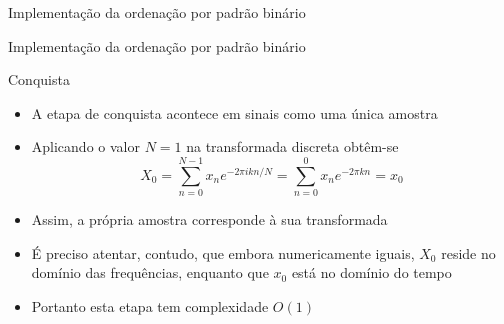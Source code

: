 

\begin{frame}[fragile]{Implementação da ordenação por padrão binário}
\end{frame}

\begin{frame}[fragile]{Implementação da ordenação por padrão binário}
\end{frame}

\begin{frame}[fragile]{Conquista}

    \begin{itemize}
        \item A etapa de conquista acontece em sinais como uma única amostra

        \item Aplicando o valor $N = 1$ na transformada discreta obtêm-se
        \[
            X_0 = \sum_{n = 0}^{N - 1} x_ne^{-2\pi ikn/N} = 
                \sum_{n = 0}^0 x_ne^{-2\pi kn} = x_0
        \]

        \item Assim, a própria amostra corresponde à sua transformada

        \item É preciso atentar, contudo, que embora numericamente iguais, $X_0$ reside no 
            domínio das frequências, enquanto que $x_0$ está no domínio do tempo

        \item Portanto esta etapa tem complexidade $O(1)$

    \end{itemize}

\end{frame}

